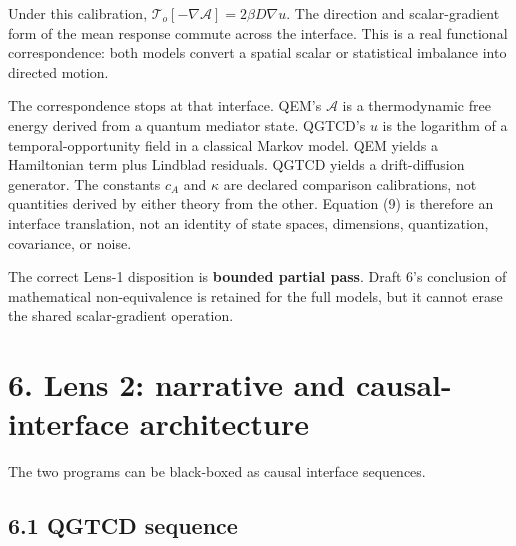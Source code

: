 \documentclass[
  american,
  11pt,
  letterpaper,
]{article}
\begin{document}
Under this calibration, \(\mathcal{T}_o[-\nabla\mathcal{A}]=2\beta D\nabla u\). The direction and scalar-gradient form of the mean response commute across the interface. This is a real functional correspondence: both models convert a spatial scalar or statistical imbalance into directed motion.

The correspondence stops at that interface. QEM's \(\mathcal{A}\) is a thermodynamic free energy derived from a quantum mediator state. QGTCD's \(u\) is the logarithm of a temporal-opportunity field in a classical Markov model. QEM yields a Hamiltonian term plus Lindblad residuals. QGTCD yields a drift-diffusion generator. The constants \(c_A\) and \(\kappa\) are declared comparison calibrations, not quantities derived by either theory from the other. Equation (9) is therefore an interface translation, not an identity of state spaces, dimensions, quantization, covariance, or noise.

The correct Lens-1 disposition is \textbf{bounded partial pass}. Draft 6's conclusion of mathematical non-equivalence is retained for the full models, but it cannot erase the shared scalar-gradient operation.

\section{6. Lens 2: narrative and causal-interface architecture}\label{lens-2-narrative-and-causal-interface-architecture}

The two programs can be black-boxed as causal interface sequences.

\subsection{6.1 QGTCD sequence}\label{qgtcd-sequence}
\end{document}
